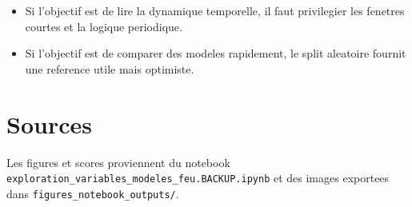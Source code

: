 \documentclass[11pt,a4paper]{article}
\begin{document}
\begin{itemize}
\item Si l'objectif est de lire la dynamique temporelle, il faut privilegier les fenetres courtes et la logique periodique.
\item Si l'objectif est de comparer des modeles rapidement, le split aleatoire fournit une reference utile mais optimiste.
\end{itemize}

\section{Sources}
Les figures et scores proviennent du notebook \texttt{exploration\_variables\_modeles\_feu.BACKUP.ipynb} et des images exportees dans \texttt{figures\_notebook\_outputs/}.
\end{document}
